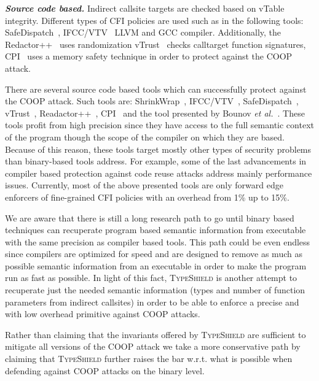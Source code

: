 \textbf{\textit{Source code based.}} Indirect callsite targets are checked based on vTable integrity.
Different types of CFI policies are used such as in the following tools:
SafeDispatch~\cite{safedispatch:jang}, IFCC/VTV~\cite{vtv:tice} LLVM and GCC compiler.
Additionally, the Redactor++~\cite{crane:readactor++} uses randomization 
vTrust~\cite{zhang:vtrust} checks calltarget function signatures, 
CPI~\cite{volodymyr:cpi} uses a memory safety technique
in order to protect against the COOP attack.

There are several source code based tools 
which can successfully protect against the COOP attack.
Such tools are: ShrinkWrap~\cite{haller:shrinkwrap}, IFCC/VTV~\cite{vtv:tice}, 
SafeDispatch~\cite{safedispatch:jang}, vTrust~\cite{zhang:vtrust}, Readactor++~\cite{crane:readactor++}, CPI~\cite{volodymyr:cpi} and the
tool presented by Bounov \textit{et al.}~\cite{bounov:interleaving}. These tools profit from high precision
since they have access to the full semantic context of the program though the scope
of the compiler on which they are based. 
Because of this reason, these tools target mostly other types of security problems than binary-based 
tools address. For example, some of the last advancements in compiler based protection against code reuse attacks address mainly performance issues.
Currently, most of the above presented tools are only forward edge enforcers of fine-grained CFI policies with an overhead from 1\% up to 15\%.

We are aware that there is still a long research path to go until binary based techniques can 
recuperate program based semantic information from executable with the same precision as compiler based tools.
This path could be even endless since compilers are optimized for speed and are designed to remove as much as possible semantic information
from an executable in order to make the program run as fast as possible. In light of this fact,
\textsc{TypeShield} is another attempt to recuperate just the needed semantic information (types and number of function parameters from
indirect callsites) in order to be able to enforce a precise and with low overhead primitive against COOP attacks.

Rather than claiming that the invariants offered by \textsc{TypeShield} are sufficient
to mitigate all versions of the COOP attack we take a more conservative path by claiming that \textsc{TypeShield} 
further raises the bar w.r.t. what is possible when defending against COOP attacks on the binary level.

